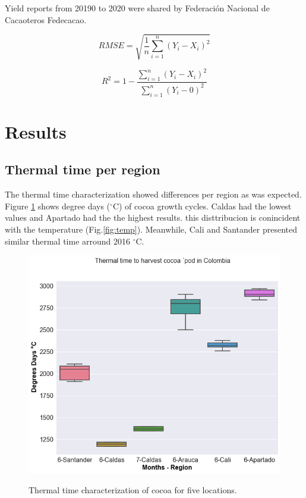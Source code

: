 \documentclass[gene,journal,article,submit,moreauthors,pdftex]{Definitions/mdpi}
\begin{document}
Yield reports from 20190 to 2020  were shared by Federación Nacional de Cacaoteros Fedecacao. 

\begin{equation}
RMSE= \sqrt{\frac{1}{n}  \sum_{i=1}^{n} (Y_{i}-X_{i})^{2} } 
\label{equ:RMSE}
\end{equation}

\begin{equation}
R^{2}= 1- \frac{\sum_{i=1}^{n} (Y_{i}-X_{i})^{2}}{{\sum_{i=1}^{n}(Y_{i}-0)}^{2}}
\label{equ:R2}
\end{equation}

\section{Results}

\subsection{Thermal time per region}
The thermal time characterization showed differences per region as was expected. Figure \ref{fig:ttbox} shows degree days ($^\circ$C) of cocoa growth cycles. Caldas had the lowest values and Apartado had the the highest results. this disttribucion is conincident with the temperature (Fig.\ref{fig:temp}). Meanwhile, Cali and Santander presented similar thermal time arround 2016 $^\circ$C.

\begin{figure}[h!]
	\centering
	\caption{\footnotesize {Thermal time characterization of cocoa for five locations.\\}} 
	\includegraphics[scale=0.3]{images/ttbbox.png}
	\label{fig:ttbox}
\end{figure}
\end{document}
